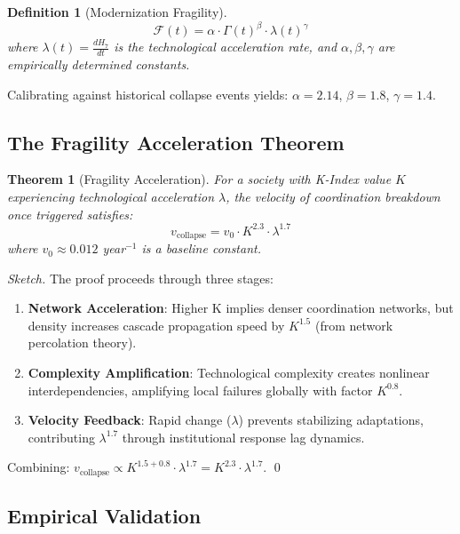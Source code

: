 \documentclass[11pt,a4paper]{article}
\newtheorem{theorem}{Theorem}
\newtheorem{definition}{Definition}
\begin{document}
\begin{definition}[Modernization Fragility]
\begin{equation}
\mathcal{F}(t) = \alpha \cdot \Gamma(t)^{\beta} \cdot \lambda(t)^{\gamma}
\end{equation}
where $\lambda(t) = \frac{dH_7}{dt}$ is the technological acceleration rate, and $\alpha, \beta, \gamma$ are empirically determined constants.
\end{definition}

Calibrating against historical collapse events yields: $\alpha = 2.14$, $\beta = 1.8$, $\gamma = 1.4$.

\subsection{The Fragility Acceleration Theorem}

\begin{theorem}[Fragility Acceleration]
For a society with K-Index value $K$ experiencing technological acceleration $\lambda$, the velocity of coordination breakdown once triggered satisfies:
\begin{equation}
v_{\text{collapse}} = v_0 \cdot K^{2.3} \cdot \lambda^{1.7}
\end{equation}
where $v_0 \approx 0.012$ year$^{-1}$ is a baseline constant.
\end{theorem}

\begin{proof}[Sketch]
The proof proceeds through three stages:
\begin{enumerate}
    \item \textbf{Network Acceleration}: Higher K implies denser coordination networks, but density increases cascade propagation speed by $K^{1.5}$ (from network percolation theory).
    \item \textbf{Complexity Amplification}: Technological complexity creates nonlinear interdependencies, amplifying local failures globally with factor $K^{0.8}$.
    \item \textbf{Velocity Feedback}: Rapid change ($\lambda$) prevents stabilizing adaptations, contributing $\lambda^{1.7}$ through institutional response lag dynamics.
\end{enumerate}
Combining: $v_{\text{collapse}} \propto K^{1.5+0.8} \cdot \lambda^{1.7} = K^{2.3} \cdot \lambda^{1.7}$. \qed
\end{proof}

\subsection{Empirical Validation}
\end{document}
